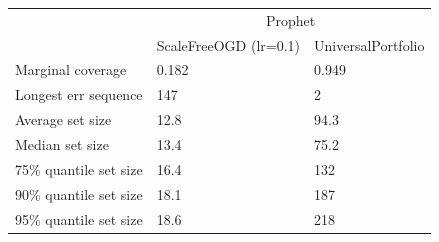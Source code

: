 \begin{tabular}{lll}
\toprule
& \multicolumn{2}{c}{Prophet} \\
& ScaleFreeOGD (lr=0.1) & UniversalPortfolio \\
\midrule
Marginal coverage & 0.182 & 0.949 \\
Longest err sequence & 147 & 2 \\
Average set size & 12.8 & 94.3 \\
Median set size & 13.4 & 75.2 \\
75\% quantile set size & 16.4 & 132 \\
90\% quantile set size & 18.1 & 187 \\
95\% quantile set size & 18.6 & 218 \\
\bottomrule
\end{tabular}
